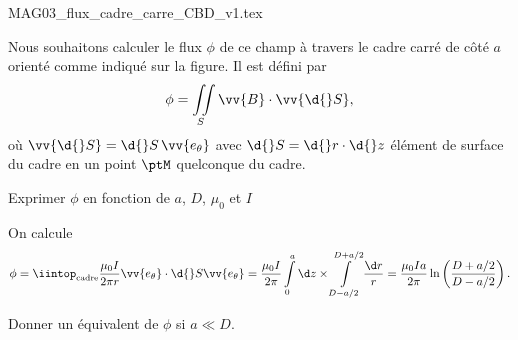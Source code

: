                                 \initialisationPartieDroite %
\begin{center}
{MAG03_flux_cadre_carre_CBD_v1.tex}
\end{center}
%
                               \finalisationDuPartageDePage %

Nous souhaitons calculer le flux $\phi$ de ce champ à travers le cadre carré de côté $a$ orienté comme indiqué sur la figure. Il est défini par
\[
\phi=\iint\limits_S \vv{B} \cdot \vv{\d{} S},
\]
où
$\vv{\d{} S}=\d{}S\,\vv{e_{\theta}}$ avec $\d{}S = \d{}r\cdot \d{}z$ élément de surface du cadre en un point $\ptM$ quelconque du cadre.




\begin{enonce}
Exprimer $\phi$ en fonction de $a$, $D$, $\mu_0$ et $I$
\end{enonce}


\begin{corrige}
On calcule \vspace{-4mm}
\[
\phi = 
\iintop_{\text{cadre}} \dfrac{\mu_{0}I}{2\pi r} \vv{e_\theta}\cdot \d{}S \vv{e_\theta}
= \dfrac{\mu_{0}I}{2\pi}\intop_{0}^{a} \d z \times \intop_{D-a/2}^{D+a/2} \dfrac{\d r}{r} 
= \dfrac{\mu_{0}Ia}{2\pi} \ln \left(\dfrac{D+a/2}{D-a/2} \right).
\]
\end{corrige}



\begin{enonce}
Donner un équivalent de $\phi$ si $a\ll D$.
\end{enonce}

